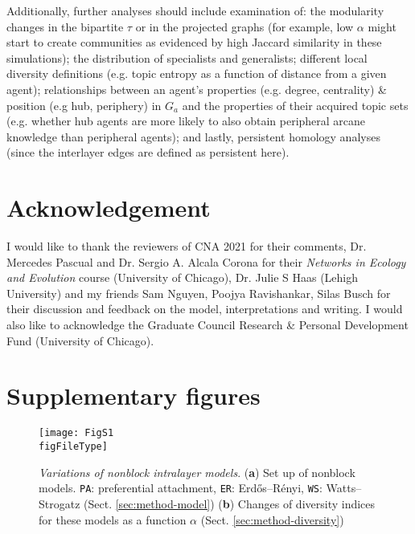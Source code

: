 \documentclass{svproc}
\def\figFileType{.eps}
\begin{document}
Additionally, further analyses should include examination of:
    the modularity changes in the bipartite $\tau$ \cite{Dankulov2015-uv} or in the projected graphs (for example, low $\alpha$ might start to create communities as evidenced by high Jaccard similarity in these simulations);
    the distribution of specialists and generalists;
    different local diversity definitions (e.g. topic entropy as a function of distance from a given agent);
    relationships between an agent's properties (e.g. degree, centrality) \& position (e.g hub, periphery) in $G_a$ and the properties of their acquired topic sets (e.g. whether hub agents are more likely to also obtain peripheral arcane knowledge than peripheral agents);
    and lastly, persistent homology analyses (since the interlayer edges are defined as persistent here).


\section{Acknowledgement}

I would like to thank
    the reviewers of CNA 2021 for their comments,
    Dr. Mercedes Pascual and Dr. Sergio A. Alcala Corona for their \textit{Networks in Ecology and Evolution} course (University of Chicago),
    Dr. Julie S Haas (Lehigh University)
    and my friends
        Sam Nguyen,
        Poojya Ravishankar,
        Silas Busch
for their discussion and feedback on the model, interpretations and writing.
I would also like to acknowledge the Graduate Council Research \& Personal Development Fund (University of Chicago).




\vspace{-2em}

\section*{Supplementary figures}

\setcounter{figure}{0}
\renewcommand{\thefigure}{S\arabic{figure}}

\begin{figure}[!ht]
    \centering
    \texttt{[image: FigS1\\figFileType]}
    \caption{
    \textit{Variations of nonblock intralayer models}.
    (\textbf{a}) Set up of nonblock models.
    \texttt{PA}: preferential attachment,
    \texttt{ER}: Erdős–Rényi,
    \texttt{WS}: Watts–Strogatz (Sect. \ref{sec:method-model})
    (\textbf{b}) Changes of diversity indices for these models as a function $\alpha$ (Sect. \ref{sec:method-diversity})
    }
    \label{supp:1}
\end{figure}
\end{document}
